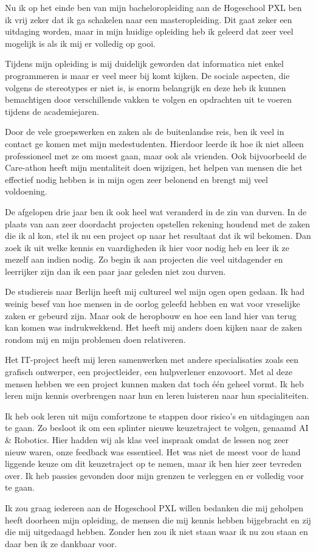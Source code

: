 Nu ik op het einde ben van mijn bacheloropleiding aan de Hogeschool PXL ben ik vrij zeker dat ik ga schakelen naar een masteropleiding. Dit gaat zeker een uitdaging worden, maar in mijn huidige opleiding heb ik geleerd dat zeer veel mogelijk is als ik mij er volledig op gooi.

Tijdens mijn opleiding is mij duidelijk geworden dat informatica niet enkel programmeren is maar er veel meer bij komt kijken. De sociale aspecten, die volgens de stereotypes er niet is, is enorm belangrijk en deze heb ik kunnen bemachtigen door verschillende vakken te volgen en opdrachten uit te voeren tijdens de academiejaren.

Door de vele groepswerken en zaken als de buitenlandse reis, ben ik veel in contact ge komen met mijn medestudenten. Hierdoor leerde ik hoe ik niet alleen professioneel met ze om moest gaan, maar ook als vrienden. Ook bijvoorbeeld de Care-athon heeft mijn mentaliteit doen wijzigen, het helpen van mensen die het effectief nodig hebben is in mijn ogen zeer belonend en brengt mij veel voldoening.

De afgelopen drie jaar ben ik ook heel wat veranderd in de zin van durven. In de plaats van aan zeer doordacht projecten opstellen rekening houdend met de zaken die ik al kon, stel ik nu een project op naar het resultaat dat ik wil bekomen. Dan zoek ik uit welke kennis en vaardigheden ik hier voor nodig heb en leer ik ze mezelf aan indien nodig. Zo begin ik aan projecten die veel uitdagender en leerrijker zijn dan ik een paar jaar geleden niet zou durven.

De studiereis naar Berlijn heeft mij cultureel wel mijn ogen open gedaan. Ik had weinig besef van hoe mensen in de oorlog geleefd hebben en wat voor vreselijke zaken er gebeurd zijn. Maar ook de heropbouw en hoe een land hier van terug kan komen was indrukwekkend. Het heeft mij anders doen kijken naar de zaken rondom mij en mijn problemen doen relativeren.

Het IT\hyp{}project heeft mij leren samenwerken met andere specialisaties zoals een grafisch ontwerper, een projectleider, een hulpverlener enzovoort. Met al deze mensen hebben we een project kunnen maken dat toch één geheel vormt. Ik heb leren mijn kennis overbrengen naar hun en leren luisteren naar hun specialiteiten.

Ik heb ook leren uit mijn comfortzone te stappen door risico's en uitdagingen aan te gaan. Zo besloot ik om een splinter nieuwe keuzetraject te volgen, genaamd AI \& Robotics. Hier hadden wij als klas veel inspraak omdat de lessen nog zeer nieuw waren, onze feedback was essentieel. Het was niet de meest voor de hand liggende keuze om dit keuzetraject op te nemen, maar ik ben hier zeer tevreden over. Ik heb passies gevonden door mijn grenzen te verleggen en er volledig voor te gaan.

Ik zou graag iedereen aan de Hogeschool PXL willen bedanken die mij geholpen heeft doorheen mijn opleiding, de mensen die mij kennis hebben bijgebracht en zij die mij uitgedaagd hebben. Zonder hen zou ik niet staan waar ik nu zou staan en daar ben ik ze dankbaar voor.